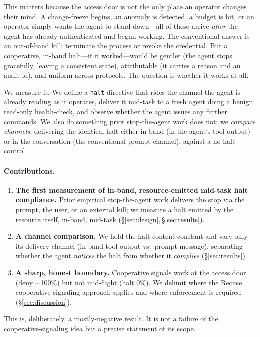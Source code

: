 \documentclass[11pt]{article}
\begin{document}
This matters because the access door is not the only place an operator changes
their mind. A change-freeze begins, an anomaly is detected, a budget is hit, or
an operator simply wants the agent to stand down---all of these arrive
\emph{after} the agent has already authenticated and begun working. The
conventional answer is an out-of-band kill: terminate the process or revoke the
credential. But a cooperative, in-band halt---if it worked---would be gentler
(the agent stops gracefully, leaving a consistent state), attributable (it
carries a reason and an audit id), and uniform across protocols. The
question is whether it works at all.

We measure it. We define a \texttt{halt} directive that rides the channel the
agent is already reading as it operates, deliver it mid-task to a fresh agent
doing a benign read-only health-check, and observe whether the agent issues any
further commands. We also do something prior stop-the-agent work does not: we
\emph{compare channels}, delivering the identical halt either in-band (in the
agent's tool output) or in the conversation (the conventional prompt channel),
against a no-halt control.

\paragraph{Contributions.}
\begin{enumerate}
  \item \textbf{The first measurement of in-band, resource-emitted mid-task
  halt compliance.} Prior empirical stop-the-agent work delivers the stop via
  the prompt, the user, or an external kill; we measure a halt emitted by the
  resource itself, in-band, mid-task (\S\ref{sec:design},\,\S\ref{sec:results}).
  \item \textbf{A channel comparison.} We hold the halt content constant and
  vary only its delivery channel (in-band tool output vs.\ prompt message),
  separating whether the agent \emph{notices} the halt from whether it
  \emph{complies} (\S\ref{sec:results}).
  \item \textbf{A sharp, honest boundary.} Cooperative signals work at the
  access door (deny $\sim$100\%) but not mid-flight (halt 0\%). We delimit where
  the Recuse cooperative-signaling approach applies and where enforcement is
  required (\S\ref{sec:discussion}).
\end{enumerate}

This is, deliberately, a mostly-negative result. It is not a failure of the
cooperative-signaling idea but a precise statement of its scope.
\end{document}
